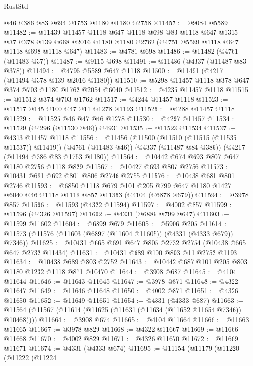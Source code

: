 \begin{lexlean}{RustStd}
\begin{coremodule}
    @46
    @386
    @83
    @694
    @1753
    @1180
    @1180
    @2758
@11457 := @9084 @5589
@11482 := @11439
    @11457
    @1118
    @647
    @1118
    @698
    @83
    @1118
    @647
    @1315
    @37
    @378
    @139
    @668
    @2016
    @1180
    @1180
    @2762
    (@4751 @5589 @1118 @647 @1118 @698 @1118 @647)
@11483 := @4781 @698
@11486 := @11482 (@4761 (@11483 @37))
@11487 := @9115 @698
@11491 := @11486 (@4337 (@11487 @83 @378))
@11494 := @4795 @5589 @647 @1118
@11500 := @11491 (@4217 (@11494 @378 @139 @2016 @1180))
@11510 := @5298 @11457 @1118 @378 @647 @374 @703 @1180 @1762 @2054 @6040
@11512 := @4235 @11457 @1118
@11515 := @11512 @374 @703 @1762
@11517 := @4244 @11457 @1118
@11523 := @11517 @145 @100 @47 @11 @1278 @1193
@11525 := @4288 @11457 @1118
@11529 := @11525 @46 @47 @46 @1278
@11530 := @4297 @11457
@11534 := @11529 (@4296 (@11530 @46)) @4931
@11535 := @11523 @11534
@11537 := @4313 @11457 @1118
@11556 := @11456
    (@11500 (@11510 (@11515 (@11535 @11537)) @11419))
    (@4761 (@11483 @46))
    (@4337 (@11487 @84 @386))
    (@4217 (@11494 @386 @83 @1753 @1180))
@11564 := @10442 @674 @693 @807 @647 @1180 @2756 @1118 @829
@11567 := @10427 @693 @807 @2756
@11573 := @10431 @681 @692 @801 @806 @2746 @2755
@11576 := @10438 @681 @801 @2746
@11593 := @6850
    @1118
    @679
    @101
    @205
    @799
    @647
    @1180
    @1427
    @6040
    @46
    @1118
    @1118
    @857
    @11353
    (@4104 (@6878 @679))
@11594 := @3978 @857
@11596 := @11593 (@4322 @11594)
@11597 := @4002 @857
@11599 := @11596 (@4326 @11597)
@11602 := @4331 (@6889 @799 @647)
@11603 := @11599 @11602
@11604 := @6899 @679
@11605 := @5906 @205
@11614 := @11573 (@11576 (@11603 (@6897 (@11604 @11605)) (@4331 (@4333 @679)) @7346))
@11625 := @10431 @665 @691 @647 @805 @2732 @2754 (@10438 @665 @647 @2732 @11434)
@11631 := @10431 @689 @100 @803 @11 @2752 @1193
@11634 := @10438 @689 @803 @2752
@11643 := @10442 @687 @101 @205 @803 @1180 @1232 @1118 @871 @10470
@11644 := @3908 @687
@11645 := @4104 @11644
@11646 := @11643 @11645
@11647 := @3978 @871
@11648 := @4322 @11647
@11649 := @11646 @11648
@11650 := @4002 @871
@11651 := @4326 @11650
@11652 := @11649 @11651
@11654 := @4331 (@4333 @687)
@11663 := @11564 (@11567 (@11614 (@11625 (@11631 (@11634 (@11652 @11654 @7346)) @10468))))
@11664 := @3908 @674
@11665 := @4104 @11664
@11666 := @11663 @11665
@11667 := @3978 @829
@11668 := @4322 @11667
@11669 := @11666 @11668
@11670 := @4002 @829
@11671 := @4326 @11670
@11672 := @11669 @11671
@11674 := @4331 (@4333 @674)
@11695 := @11154
    (@11179
      (@11220
        (@11222
          (@11224

\end{coremodule}
\end{lexlean}

